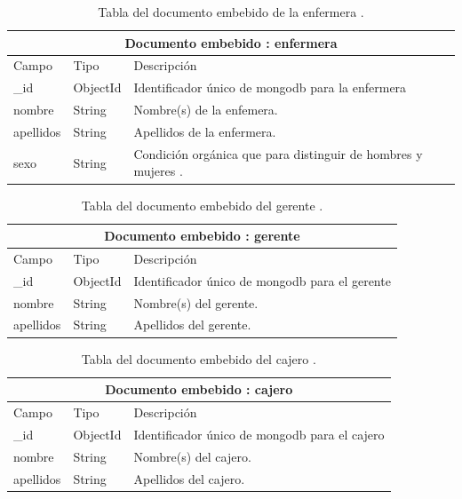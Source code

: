 	\begin{table}[htb]
	\centering
	\begin{tabular}{| p{3.5cm}| p{3.0cm} | p{9.8cm} |}
	\hline
	\multicolumn{3}{|c|}{Documento embebido : enfermera} \\
	\hline
	Campo & Tipo &  Descripción\\ \hline
	\_id & ObjectId & Identificador único de mongodb para la enfermera \\ \hline
	nombre & String & Nombre(s) de la enfemera.\\ \hline
	apellidos & String & Apellidos de la enfermera.\\ \hline
	sexo & String & Condición orgánica que para distinguir de hombres y mujeres .\\ \hline
	\end{tabular}
	\caption{Tabla del documento embebido de la enfermera .}
	\label{tabla:diccionarioDatos}
	\end{table}
	\begin{table}[htb]
	\centering
	\begin{tabular}{| p{3.5cm}| p{3.0cm} | p{9.8cm} |}
	\hline
	\multicolumn{3}{|c|}{Documento embebido : gerente} \\
	\hline
	Campo & Tipo &  Descripción\\ \hline
	\_id & ObjectId & Identificador único de mongodb para el gerente \\ \hline
	nombre & String & Nombre(s) del gerente.\\ \hline
	apellidos & String & Apellidos del gerente.\\ \hline
	\end{tabular}
	\caption{Tabla del documento embebido del gerente .}
	\label{tabla:diccionarioDatos}
	\end{table}
	\begin{table}[htb]
	\centering
	\begin{tabular}{| p{3.5cm}| p{3.0cm} | p{9.8cm} |}
	\hline
	\multicolumn{3}{|c|}{Documento embebido : cajero} \\
	\hline
	Campo & Tipo &  Descripción\\ \hline
	\_id & ObjectId & Identificador único de mongodb para el cajero \\ \hline
	nombre & String & Nombre(s) del cajero.\\ \hline
	apellidos & String & Apellidos del cajero.\\ \hline
	\end{tabular}
	\caption{Tabla del documento embebido del cajero .}
	\label{tabla:diccionarioDatos}
	\end{table}
